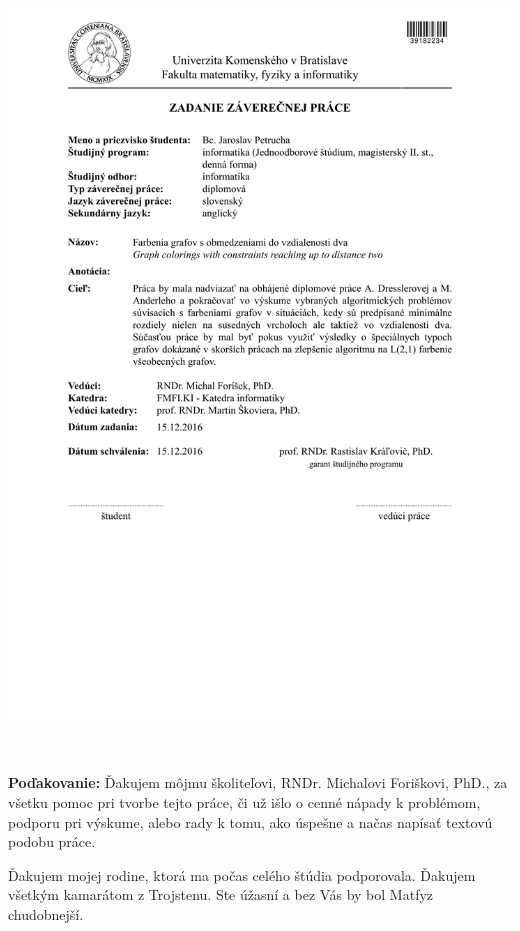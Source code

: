 \documentclass[12pt, oneside]{book}
\begin{document}
\newpage 
\thispagestyle{empty}
\hspace{-2cm}\includegraphics[width=1.1\textwidth]{images/zadanie}


\frontmatter

\setcounter{page}{3}
\newpage 
~

\vfill
{\bf Poďakovanie:} Ďakujem môjmu školiteľovi, RNDr. Michalovi Foriškovi, PhD., za všetku
pomoc pri tvorbe tejto práce, či už išlo o cenné nápady k problémom, podporu pri
výskume, alebo rady k tomu, ako úspešne a načas napísať textovú podobu práce.

Ďakujem mojej rodine, ktorá ma počas celého štúdia podporovala. Ďakujem všetkým kamarátom
z Trojstenu. Ste úžasní a bez Vás by bol Matfyz chudobnejší.
\end{document}

